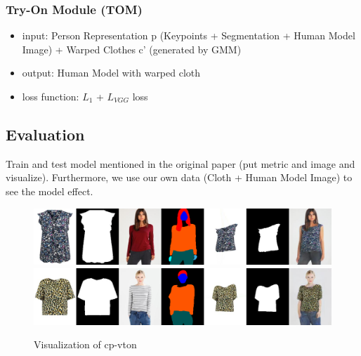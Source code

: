 \documentclass{article}
\begin{document}
\subsubsection{Try-On Module (TOM)}
    \begin{itemize}
        \item input: Person Representation p (Keypoints + Segmentation + Human Model Image) + Warped Clothes c' (generated by GMM)
        \item output: Human Model with warped cloth
        \item loss function: $L_{1}$  + $L_{VGG}$ loss
    \end{itemize}

\subsection{Evaluation}
Train and test model mentioned in the original paper (put metric and image and visualize). Furthermore, we use our own data (Cloth + Human Model Image) to see the model effect.

\begin{figure}[h]
    \centering
    \includegraphics[width=1\textwidth]{cp-vton-imgs/visual1.png}
    \includegraphics[width=1\textwidth]{cp-vton-imgs/visual2.png}
    \caption{Visualization of cp-vton \cite{vdr}}
\end{figure}



\printbibliography
\end{document}
